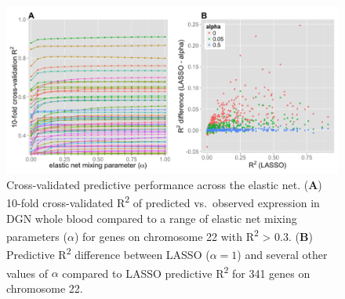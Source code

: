 \documentclass[]{article}
\begin{document}
\begin{figure}[htbp]
\centering
\includegraphics{GenArch_manuscript_files/figure-latex/EN-1.pdf}
\caption{Cross-validated predictive performance across the elastic net.
(\textbf{A}) 10-fold cross-validated R\textsuperscript{2} of predicted
vs.~observed expression in DGN whole blood compared to a range of
elastic net mixing parameters (\(\alpha\)) for genes on chromosome 22
with R\textsuperscript{2} \textgreater{} 0.3. (\textbf{B}) Predictive
R\textsuperscript{2} difference between LASSO (\(\alpha = 1\)) and
several other values of \(\alpha\) compared to LASSO predictive
R\textsuperscript{2} for 341 genes on chromosome 22.}
\end{figure}
\end{document}
